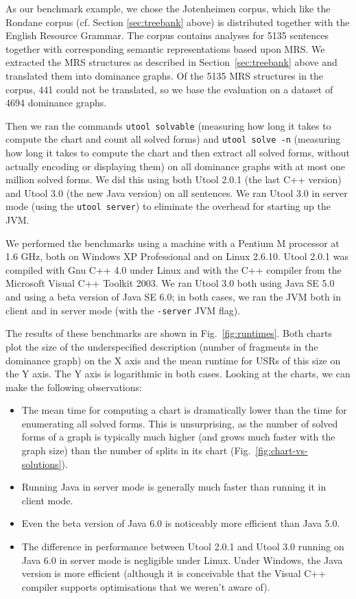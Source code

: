 As our benchmark example, we chose the Jotenheimen corpus, which like
the Rondane corpus (cf. Section \ref{sec:treebank} above) is
distributed together with the English Resource Grammar. The corpus
contains analyses for 5135 sentences together with corresponding
semantic representations based upon MRS. We extracted the MRS
structures as described in Section~\ref{sec:treebank} above and
translated them into dominance graphs. Of the 5135 MRS structures in
the corpus, 441 could not be translated, so we base the evaluation on
a dataset of 4694 dominance graphs.

Then we ran the commands
\verb?utool solvable? (measuring how long it takes to compute the
chart and count all solved forms) and \verb?utool solve -n? (measuring
how long it takes to compute the chart and then extract all solved
forms, without actually encoding or displaying them) on all dominance graphs with at most one million solved forms. We did this
using both Utool 2.0.1 (the last C++ version) and Utool 3.0 (the new
Java version) on all sentences. We ran Utool 3.0 in server mode (using
the \verb?utool server?) to eliminate the overhead for starting up the
JVM.

We performed the benchmarks using a machine with a Pentium M processor
at 1.6 GHz, both on Windows XP Professional and on Linux 2.6.10. Utool
2.0.1 was compiled with Gnu C++ 4.0 under Linux and with the C++
compiler from the Microsoft Visual C++ Toolkit 2003. We ran Utool 3.0
both using Java SE 5.0 and using a beta version of Java SE 6.0; in
both cases, we ran the JVM both in client and in server mode (with the
\verb?-server? JVM flag).

The results of these benchmarks are shown in
Fig.~\ref{fig:runtimes}. Both charts plot the size of the
underspecified description (number of fragments in the dominance
graph) on the X axis and the mean runtime for USRs of this size on the
Y axis. The Y axis is logarithmic in both cases. Looking at the
charts, we can make the following observations:
\begin{itemize}
\item The mean time for computing a chart is dramatically lower than
the time for enumerating all solved forms. This is unsurprising, as
the number of solved forms of a graph is typically much higher (and
grows much faster with the graph size) than the number of splits in
its chart (Fig.~\ref{fig:chart-vs-solutions}).
\item Running Java in server mode is generally much faster than
running it in client mode.
\item Even the beta version of Java 6.0 is noticeably more efficient
than Java 5.0.
\item The difference in performance between Utool 2.0.1 and Utool 3.0
running on Java 6.0 in server mode is negligible under Linux. Under
Windows, the Java version is more efficient (although it is
conceivable that the Visual C++ compiler supports optimisations that
we weren't aware of).
\end{itemize}




